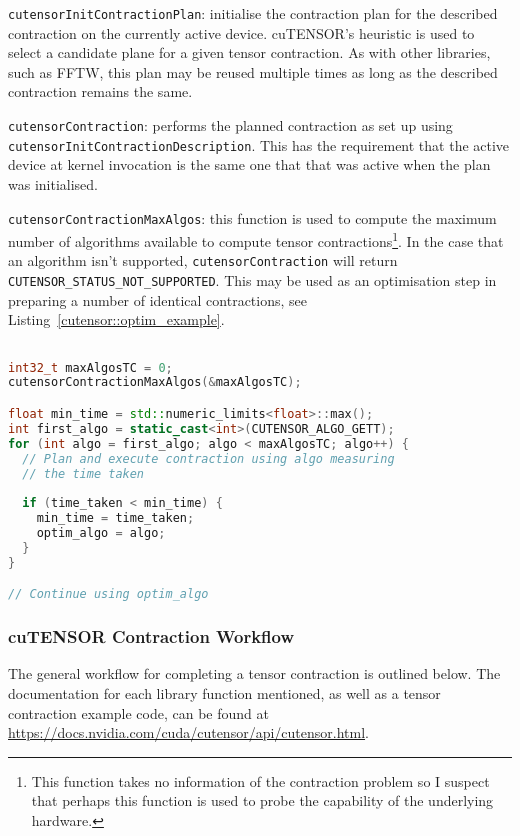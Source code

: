 \documentclass[12pt]{article}
\begin{document}
\vspace{0.5em}\texttt{cutensorInitContractionPlan}: initialise the contraction plan for the described contraction on the currently active device. cuTENSOR’s heuristic is used to select a candidate plane for a given tensor contraction. As with other libraries, such as FFTW, this plan may be reused multiple times as long as the described contraction remains the same.


\vspace{0.5em}\texttt{cutensorContraction}: performs the planned contraction as set up using \texttt{cutensorInitContractionDescription}. This has the requirement that the active device at kernel invocation is the same one that that was active when the plan was initialised.


\vspace{0.5em}\texttt{cutensorContractionMaxAlgos}: this function is used to compute the maximum number of algorithms available to compute tensor contractions\footnote{This function takes no information of the contraction problem so I suspect that perhaps this function is used to probe the capability of the underlying hardware.}. In the case that an algorithm isn't supported, \texttt{cutensorContraction} will return \texttt{CUTENSOR\_STAT\-US\_NOT\_SUPPORTED}. This may be used as an optimisation step in preparing a number of identical contractions, see Listing~\ref{cutensor::optim_example}.

\begin{lstlisting}[language=C++, label=cutensor::optim_example, basicstyle=\small, caption=Finding the most efficient 
algorithm]

int32_t maxAlgosTC = 0;
cutensorContractionMaxAlgos(&maxAlgosTC);

float min_time = std::numeric_limits<float>::max();
int first_algo = static_cast<int>(CUTENSOR_ALGO_GETT);
for (int algo = first_algo; algo < maxAlgosTC; algo++) {
  // Plan and execute contraction using algo measuring
  // the time taken
  
  if (time_taken < min_time) {
    min_time = time_taken;
    optim_algo = algo;
  }
}

// Continue using optim_algo
\end{lstlisting}

\subsubsection{cuTENSOR Contraction Workflow} \label{cutensor::workflow}
The general workflow for completing a tensor contraction is outlined below. The documentation for each library function mentioned, as well as a tensor contraction example code, can be found at \url{https://docs.nvidia.com/cuda/cutensor/api/cutensor.html}.
\end{document}
